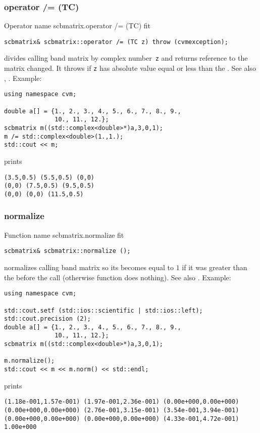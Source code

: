 \subsubsection{operator /= (TC)}
Operator%
\pdfdest name {scbmatrix.operator /= (TC)} fit
\begin{verbatim}
scbmatrix& scbmatrix::operator /= (TC z) throw (cvmexception);
\end{verbatim}
divides  calling band matrix by  complex number~\verb"z"
and returns  reference to
the matrix changed.
It throws  
if \verb"z" has  absolute value equal or less
than the 
.
See also ,
.
Example:
\begin{Verbatim}
using namespace cvm;

double a[] = {1., 2., 3., 4., 5., 6., 7., 8., 9.,
              10., 11., 12.};
scbmatrix m((std::complex<double>*)a,3,0,1);
m /= std::complex<double>(1.,1.);
std::cout << m;
\end{Verbatim}
prints
\begin{Verbatim}
(3.5,0.5) (5.5,0.5) (0,0)
(0,0) (7.5,0.5) (9.5,0.5)
(0,0) (0,0) (11.5,0.5)
\end{Verbatim}
\newpage



\subsubsection{normalize}
Function%
\pdfdest name {scbmatrix.normalize} fit
\begin{verbatim}
scbmatrix& scbmatrix::normalize ();
\end{verbatim}
normalizes  calling band matrix so its 
becomes equal to $1$ if it was greater than the 
before the call (otherwise function does nothing).
See also .
Example:
\begin{Verbatim}
using namespace cvm;

std::cout.setf (std::ios::scientific | std::ios::left); 
std::cout.precision (2);
double a[] = {1., 2., 3., 4., 5., 6., 7., 8., 9.,
              10., 11., 12.};
scbmatrix m((std::complex<double>*)a,3,0,1);

m.normalize();
std::cout << m << m.norm() << std::endl;
\end{Verbatim}
prints
\begin{Verbatim}
(1.18e-001,1.57e-001) (1.97e-001,2.36e-001) (0.00e+000,0.00e+000)
(0.00e+000,0.00e+000) (2.76e-001,3.15e-001) (3.54e-001,3.94e-001)
(0.00e+000,0.00e+000) (0.00e+000,0.00e+000) (4.33e-001,4.72e-001)
1.00e+000
\end{Verbatim}
\newpage



